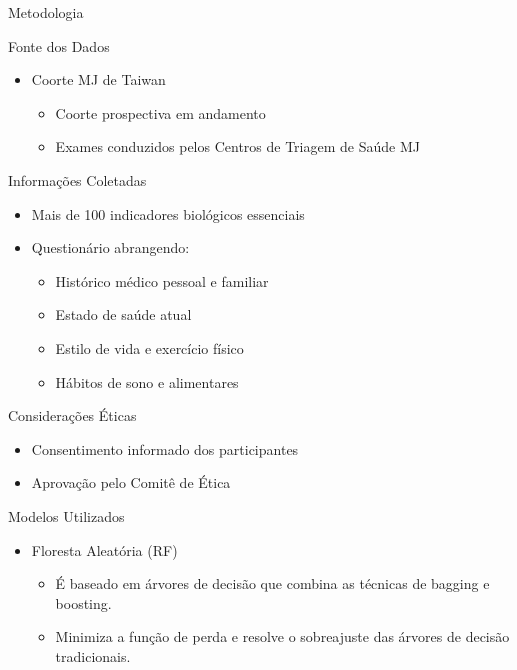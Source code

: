 \begin{frame}{Metodologia}
\end{frame}
\begin{frame}{Fonte dos Dados}
	\begin{itemize}
		\item Coorte MJ de Taiwan  
		\begin{itemize}
			\item Coorte prospectiva em andamento  
			\item Exames conduzidos pelos Centros de Triagem de Saúde MJ  
		\end{itemize}
	\end{itemize}
\end{frame}

\begin{frame}{Informações Coletadas}
	\begin{itemize}
		\item Mais de 100 indicadores biológicos essenciais  
		\item Questionário abrangendo:  
		\begin{itemize}
			\item Histórico médico pessoal e familiar  
			\item Estado de saúde atual  
			\item Estilo de vida e exercício físico  
			\item Hábitos de sono e alimentares  
		\end{itemize}
	\end{itemize}
\end{frame}

\begin{frame}{Considerações Éticas}
	\begin{itemize}
		\item Consentimento informado dos participantes  
		\item Aprovação pelo Comitê de Ética
	\end{itemize}
\end{frame}

\begin{frame}{Modelos Utilizados}
	\begin{itemize}
		\item Floresta Aleatória (RF)
		\begin{itemize}
			\item É baseado em árvores de decisão que combina as técnicas de bagging e boosting.
			\item Minimiza a função de perda e resolve o sobreajuste das árvores de decisão tradicionais.
		\end{itemize}
	\end{itemize}
\end{frame}

